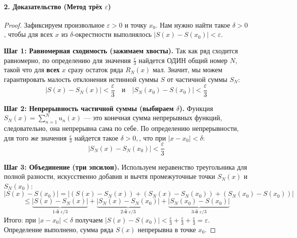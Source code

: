 \paragraph{2. Доказательство (Метод трёх $\varepsilon$)}
\begin{proof}
Зафиксируем произвольное $\varepsilon > 0$ и точку $x_0$. Нам нужно найти такое $\delta > 0$, чтобы для всех $x$ из $\delta$-окрестности выполнялось $|S(x) - S(x_0)| < \varepsilon$.

\textbf{Шаг 1: Равномерная сходимость (зажимаем хвосты).} 
Так как ряд сходится равномерно, по определению для значения $\frac{\varepsilon}{3}$ найдется ОДИН общий номер $N$, такой что для \textbf{всех} $x$ сразу остаток ряда $R_N(x)$ мал. Значит, мы можем гарантировать малость отклонения истинной суммы $S$ от частичной суммы $S_N$:
$$ |S(x) - S_N(x)| < \frac{\varepsilon}{3} \quad \text{и} \quad |S_N(x_0) - S(x_0)| < \frac{\varepsilon}{3} $$

\textbf{Шаг 2: Непрерывность частичной суммы (выбираем $\delta$).} 
Функция $S_N(x) = \sum_{n=1}^N u_n(x)$ — это конечная сумма непрерывных функций, следовательно, она непрерывна сама по себе. По определению непрерывности, для того же значения $\frac{\varepsilon}{3}$ найдется такое $\delta > 0,$, что при $|x - x_0| < \delta$:
$$ |S_N(x) - S_N(x_0)| < \frac{\varepsilon}{3} $$

\textbf{Шаг 3: Объединение (три эпсилон).} 
Используем неравенство треугольника для полной разности, искусственно добавив и вычтя промежуточные точки $S_N(x)$ и $S_N(x_0)$:
$$ |S(x) - S(x_0)| = |(S(x) - S_N(x)) + (S_N(x) - S_N(x_0)) + (S_N(x_0) - S(x_0))| $$
$$ \le \underbrace{|S(x) - S_N(x)|}_{1\text{-й } \varepsilon/3} + \underbrace{|S_N(x) - S_N(x_0)|}_{2\text{-й } \varepsilon/3} + \underbrace{|S_N(x_0) - S(x_0)|}_{3\text{-й } \varepsilon/3} $$
Итого: при $|x - x_0| < \delta$ получаем $|S(x) - S(x_0)| < \frac{\varepsilon}{3} + \frac{\varepsilon}{3} + \frac{\varepsilon}{3} = \varepsilon$. 
Определение выполнено, сумма ряда $S(x)$ непрерывна в точке $x_0$.
\end{proof}

